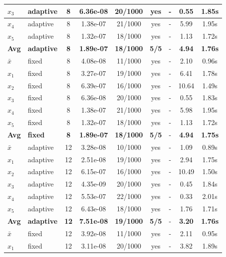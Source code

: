 \begin{longtable}{|l|l|c|c|c|c|c|c|c|}
\hline
$x_3$ & adaptive & 8 & 6.36e-08 & 20/1000 & yes & - & 0.55 & 1.85s \\
\hline
$x_4$ & adaptive & 8 & 1.38e-07 & 21/1000 & yes & - & 5.99 & 1.95s \\
\hline
$x_5$ & adaptive & 8 & 1.32e-07 & 18/1000 & yes & - & 1.13 & 1.72s \\
\hline
\hline\hline
\textbf{Avg} & \textbf{adaptive} & \textbf{8} & \textbf{1.89e-07} & \textbf{18/1000} & \textbf{5/5} & - & \textbf{4.94} & \textbf{1.76s} \\
\hline\hline
\hline
$\bar{x}$ & fixed & 8 & 4.08e-08 & 11/1000 & yes & - & 2.10 & 0.96s \\
\hline
$x_1$ & fixed & 8 & 3.27e-07 & 19/1000 & yes & - & 6.41 & 1.78s \\
\hline
$x_2$ & fixed & 8 & 6.39e-07 & 16/1000 & yes & - & 10.64 & 1.49s \\
\hline
$x_3$ & fixed & 8 & 6.36e-08 & 20/1000 & yes & - & 0.55 & 1.83s \\
\hline
$x_4$ & fixed & 8 & 1.38e-07 & 21/1000 & yes & - & 5.98 & 1.95s \\
\hline
$x_5$ & fixed & 8 & 1.32e-07 & 18/1000 & yes & - & 1.13 & 1.72s \\
\hline
\hline\hline
\textbf{Avg} & \textbf{fixed} & \textbf{8} & \textbf{1.89e-07} & \textbf{18/1000} & \textbf{5/5} & - & \textbf{4.94} & \textbf{1.75s} \\
\hline\hline
$\bar{x}$ & adaptive & 12 & 3.28e-08 & 10/1000 & yes & - & 1.09 & 0.89s \\
\hline
$x_1$ & adaptive & 12 & 2.51e-08 & 19/1000 & yes & - & 2.94 & 1.75s \\
\hline
$x_2$ & adaptive & 12 & 6.15e-07 & 16/1000 & yes & - & 10.49 & 1.50s \\
\hline
$x_3$ & adaptive & 12 & 4.35e-09 & 20/1000 & yes & - & 0.45 & 1.84s \\
\hline
$x_4$ & adaptive & 12 & 5.53e-07 & 22/1000 & yes & - & 0.33 & 2.01s \\
\hline
$x_5$ & adaptive & 12 & 6.43e-08 & 18/1000 & yes & - & 1.76 & 1.71s \\
\hline
\hline\hline
\textbf{Avg} & \textbf{adaptive} & \textbf{12} & \textbf{7.51e-08} & \textbf{19/1000} & \textbf{5/5} & - & \textbf{3.20} & \textbf{1.76s} \\
\hline\hline
\hline
$\bar{x}$ & fixed & 12 & 3.92e-08 & 11/1000 & yes & - & 2.11 & 0.95s \\
\hline
$x_1$ & fixed & 12 & 3.11e-08 & 20/1000 & yes & - & 3.82 & 1.89s \\

\end{longtable}
